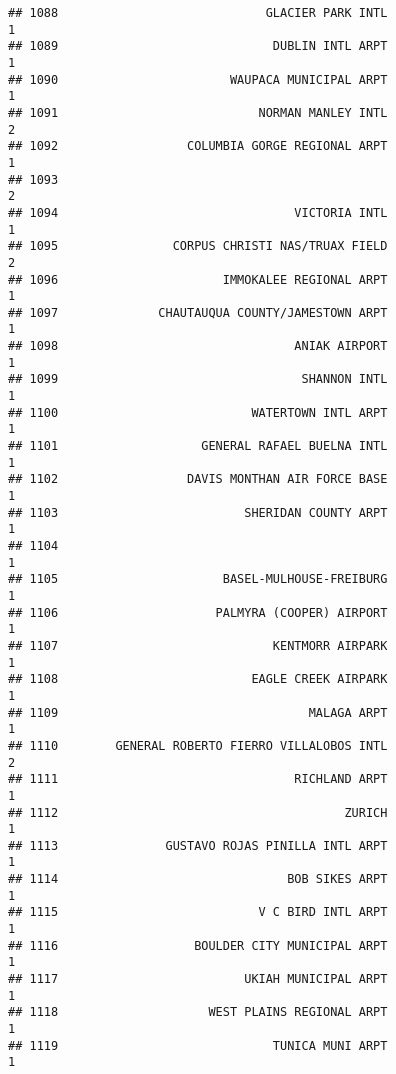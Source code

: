 \documentclass[
]{article}
\begin{document}
\begin{verbatim}
## 1088                             GLACIER PARK INTL                           1
## 1089                              DUBLIN INTL ARPT                           1
## 1090                        WAUPACA MUNICIPAL ARPT                           1
## 1091                            NORMAN MANLEY INTL                           2
## 1092                  COLUMBIA GORGE REGIONAL ARPT                           1
## 1093                                                                         2
## 1094                                 VICTORIA INTL                           1
## 1095                CORPUS CHRISTI NAS/TRUAX FIELD                           2
## 1096                       IMMOKALEE REGIONAL ARPT                           1
## 1097              CHAUTAUQUA COUNTY/JAMESTOWN ARPT                           1
## 1098                                 ANIAK AIRPORT                           1
## 1099                                  SHANNON INTL                           1
## 1100                           WATERTOWN INTL ARPT                           1
## 1101                    GENERAL RAFAEL BUELNA INTL                           1
## 1102                  DAVIS MONTHAN AIR FORCE BASE                           1
## 1103                          SHERIDAN COUNTY ARPT                           1
## 1104                                                                         1
## 1105                       BASEL-MULHOUSE-FREIBURG                           1
## 1106                      PALMYRA (COOPER) AIRPORT                           1
## 1107                              KENTMORR AIRPARK                           1
## 1108                           EAGLE CREEK AIRPARK                           1
## 1109                                   MALAGA ARPT                           1
## 1110        GENERAL ROBERTO FIERRO VILLALOBOS INTL                           2
## 1111                                 RICHLAND ARPT                           1
## 1112                                        ZURICH                           1
## 1113               GUSTAVO ROJAS PINILLA INTL ARPT                           1
## 1114                                BOB SIKES ARPT                           1
## 1115                            V C BIRD INTL ARPT                           1
## 1116                   BOULDER CITY MUNICIPAL ARPT                           1
## 1117                          UKIAH MUNICIPAL ARPT                           1
## 1118                     WEST PLAINS REGIONAL ARPT                           1
## 1119                              TUNICA MUNI ARPT                           1

\end{verbatim}
\end{document}
